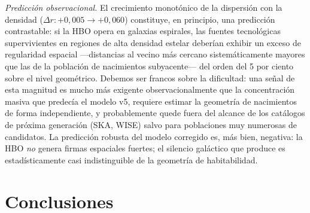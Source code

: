 \documentclass[useAMS,usenatbib,onecolumn]{mn2e}
\begin{document}
\textit{Predicción observacional.}
El crecimiento monotónico de la dispersión con la densidad
($\Delta r: +0{,}005 \to +0{,}060$) constituye, en principio, una
predicción contrastable: si la HBO opera en galaxias espirales, las
fuentes tecnológicas supervivientes en regiones de alta densidad
estelar deberían exhibir un exceso de regularidad espacial —distancias
al vecino más cercano sistemáticamente mayores que las de la población
de nacimientos subyacente— del orden del 5 por ciento sobre el nivel
geométrico.
Debemos ser francos sobre la dificultad: una señal de esta magnitud es
mucho más exigente observacionalmente que la concentración masiva que
predecía el modelo v5, requiere estimar la geometría de nacimientos de
forma independiente, y probablemente quede fuera del alcance de los
catálogos de próxima generación (SKA, WISE) salvo para poblaciones
muy numerosas de candidatos.
La predicción robusta del modelo corregido es, más bien, negativa: la
HBO \emph{no} genera firmas espaciales fuertes; el silencio galáctico
que produce es estadísticamente casi indistinguible de la geometría
de habitabilidad.

\section{Conclusiones}
\label{sec:conclusions}
\end{document}
